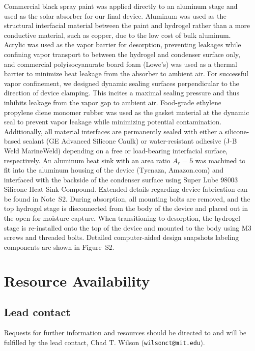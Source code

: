 \documentclass[11pt]{article}
\begin{document}
Commercial black spray paint was applied directly to an aluminum stage and used as the solar absorber for our final device. Aluminum was used as the structural interfacial material between the paint and hydrogel rather than a more conductive material, such as copper, due to the low cost of bulk aluminum. Acrylic was used as the vapor barrier for desorption, preventing leakages while confining vapor transport to between the hydrogel and condenser surface only, and commercial polyisocyanurate board foam (Lowe's) was used as a thermal barrier to minimize heat leakage from the absorber to ambient air. For successful vapor confinement, we designed dynamic sealing surfaces perpendicular to the direction of device clamping. This incites a maximal sealing pressure and thus inhibits leakage from the vapor gap to ambient air. Food-grade ethylene propylene diene monomer rubber was used as the gasket material at the dynamic seal to prevent vapor leakage while minimizing potential contamination. Additionally, all material interfaces are permanently sealed with either a silicone-based sealant (GE Advanced Silicone Caulk) or water-resistant adhesive (J-B Weld MarineWeld) depending on a free or load-bearing interfacial surface, respectively. An aluminum heat sink with an area ratio $A_r = 5$ was machined to fit into the aluminum housing of the device (Tyenaza, Amazon.com) and interfaced with the backside of the condenser surface using Super Lube 98003 Silicone Heat Sink Compound. Extended details regarding device fabrication can be found in Note~S2. During absorption, all mounting bolts are removed, and the top hydrogel stage is disconnected from the body of the device and placed out in the open for moisture capture. When transitioning to desorption, the hydrogel stage is re-installed onto the top of the device and mounted to the body using M3 screws and threaded bolts. Detailed computer-aided design snapshots labeling components are shown in Figure~S2.

\section*{Resource Availability}

\subsection*{Lead contact}
Requests for further information and resources should be directed to and will be fulfilled by the lead contact, Chad T. Wilson (\texttt{wilsonct@mit.edu}).
\end{document}
